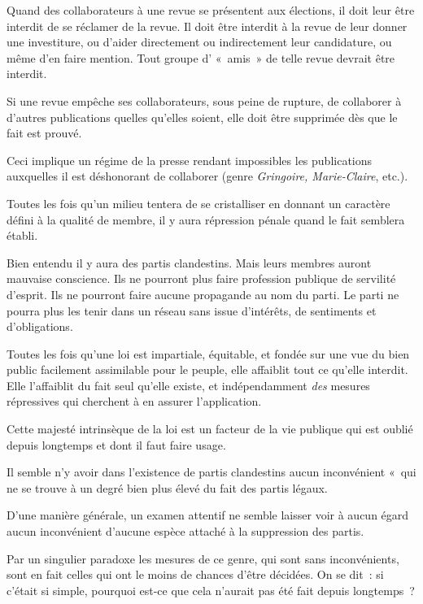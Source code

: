 \documentclass[french,twoside]{book} %
\begin{document}
Quand des collaborateurs à une revue se présentent aux élections, il doit leur être interdit de se réclamer de la revue. Il doit être interdit à la revue de leur donner une investiture, ou d’aider directement ou indirectement leur candidature, ou même d’en faire mention. Tout groupe d’ « amis » de telle revue devrait être interdit.\par
Si une revue empêche ses collaborateurs, sous peine de rupture, de collaborer à d’autres publications quelles qu’elles soient, elle doit être supprimée dès que le fait est prouvé.\par
Ceci implique un régime de la presse rendant impossibles les publications auxquelles il est déshonorant de collaborer (genre \emph{Gringoire, Marie-Claire}, etc.).\par
Toutes les fois qu’un milieu tentera de se cristalliser en donnant un caractère défini à la qualité de membre, il y aura répression pénale quand le fait semblera établi.\par
Bien entendu il y aura des partis clandestins. Mais leurs membres auront mauvaise conscience. Ils ne pourront plus faire profession publique de servilité d’esprit. Ils ne pourront faire aucune propagande au nom du parti. Le parti ne pourra plus les tenir dans un réseau sans issue d’intérêts, de sentiments et d’obligations.\par
Toutes les fois qu’une loi est impartiale, équitable, et fondée sur une vue du bien public facilement assimilable pour le peuple, elle affaiblit tout ce qu’elle interdit. Elle l’affaiblit du fait seul qu’elle existe, et indépendamment \emph{des} mesures répressives qui cherchent à en assurer l’application.\par
Cette majesté intrinsèque de la loi est un facteur de la vie publique qui est oublié depuis longtemps et dont il faut faire usage.\par
Il semble n’y avoir dans l’existence de partis clandestins aucun inconvénient « qui ne se trouve à un degré bien plus élevé du fait des partis légaux.\par
D’une manière générale, un examen attentif ne semble laisser voir à aucun égard aucun inconvénient d’aucune espèce attaché à la suppression des partis.\par
Par un singulier paradoxe les mesures de ce genre, qui sont sans inconvénients, sont en fait celles qui ont le moins de chances d’être décidées. On se dit : si c’était si simple, pourquoi est-ce que cela n’aurait pas été fait depuis longtemps ?\par
\end{document}
